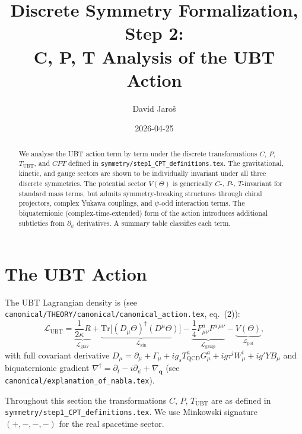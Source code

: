 \documentclass[12pt,a4paper]{article}
\title{\textbf{Discrete Symmetry Formalization, Step 2:\\
                 C, P, T Analysis of the UBT Action}}
\author{David Jaro\v{s}}
\date{2026-04-25}
\theoremstyle{definition}
\theoremstyle{remark}
\begin{document}
  \maketitle

  \begin{abstract}
  We analyse the UBT action term by term under the discrete transformations
  $C$, $P$, $T_{\mathrm{UBT}}$, and $CPT$ defined in
  \texttt{symmetry/step1\_CPT\_definitions.tex}.
  The gravitational, kinetic, and gauge sectors are shown to be individually
  invariant under all three discrete symmetries.
  The potential sector $V(\Theta)$ is generically $C$-, $P$-, $T$-invariant
  for standard mass terms, but admits symmetry-breaking structures through
  chiral projectors, complex Yukawa couplings, and $\psi$-odd interaction
  terms.
  The biquaternionic (complex-time-extended) form of the action introduces
  additional subtleties from $\partial_\psi$ derivatives.
  A summary table classifies each term.
  \end{abstract}
\fi

\section{The UBT Action}
\label{sec:act:action}

The UBT Lagrangian density is (see
\texttt{canonical/THEORY/canonical/canonical\_action.tex}, eq.~(2)):
\begin{equation}
  \mathcal{L}_{\mathrm{UBT}}
  = \underbrace{\frac{1}{2\kappa}R}_{\mathcal{L}_{\mathrm{grav}}}
  + \underbrace{\mathrm{Tr}\!\bigl[(D_\mu\Theta)^\dagger(D^\mu\Theta)\bigr]}%
    _{\mathcal{L}_{\mathrm{kin}}}
  - \underbrace{\frac{1}{4}F_{\mu\nu}^a F^{a\,\mu\nu}}_{\mathcal{L}_{\mathrm{gauge}}}
  - \underbrace{V(\Theta)}_{\mathcal{L}_{\mathrm{pot}}},
  \label{eq:act:Ltotal}
\end{equation}
with full covariant derivative
$D_\mu = \partial_\mu + \Gamma_\mu + ig_s T^a_{\mathrm{QCD}} G^a_\mu
+ ig\tau^i W^i_\mu + ig' Y B_\mu$
and biquaternionic gradient
$\nabla^\dagger = \partial_t - i\partial_\psi + \overline{\nabla}_\mathbf{q}$
(see \texttt{canonical/explanation\_of\_nabla.tex}).

Throughout this section the transformations $C$, $P$, $T_{\mathrm{UBT}}$ are
as defined in \texttt{symmetry/step1\_CPT\_definitions.tex}.
We use Minkowski signature $(+,-,-,-)$ for the real spacetime sector.
\end{document}
